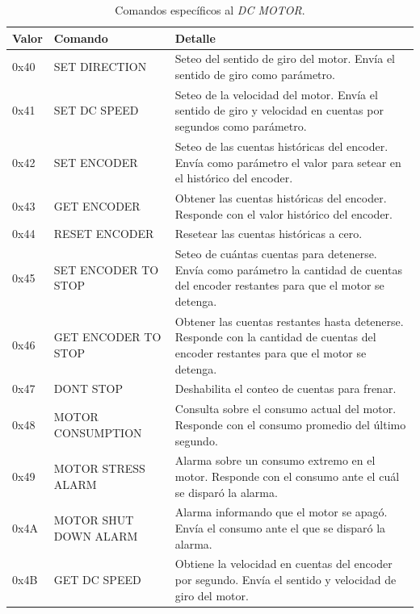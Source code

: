 \begin{table}
	\begin{center}
		\begin{tabular}{|l|p{2.5cm}|p{7.5cm}|}
		\hline
		Valor & Comando & Detalle \\
		\hline
		0x40 & SET DIRECTION & Seteo del sentido de giro del motor.
		Env\'ia el sentido de giro como par\'ametro. \\
		\hline
		0x41 & SET DC SPEED & Seteo de la velocidad del motor.
		Env\'ia el sentido de giro y velocidad en cuentas por segundos como par\'ametro. \\
		\hline
		0x42 & SET ENCODER & Seteo de las cuentas hist\'oricas del encoder.
		Env\'ia como par\'ametro el valor para setear en el hist\'orico del encoder. \\
		\hline
		0x43 & GET ENCODER & Obtener las cuentas hist\'oricas del encoder.
		Responde con el valor hist\'orico del encoder. \\
		\hline
		0x44 & RESET ENCODER & Resetear las cuentas hist\'oricas a cero. \\
		\hline
		0x45 & SET ENCODER TO STOP & Seteo de cu\'antas cuentas para detenerse.
		Env\'ia como par\'ametro la cantidad de cuentas del encoder restantes para
		que el motor se detenga. \\
		\hline
		0x46 & GET ENCODER TO STOP & Obtener las cuentas restantes hasta detenerse.
		Responde con la cantidad de cuentas del encoder restantes para que el motor se detenga. \\
		\hline
		0x47 & DONT STOP & Deshabilita el conteo de cuentas para frenar. \\
		\hline
		0x48 & MOTOR CONSUMPTION & Consulta sobre el consumo actual del motor.
		Responde con el consumo promedio del \'ultimo segundo. \\
		\hline
		0x49 & MOTOR STRESS ALARM & Alarma sobre un consumo extremo en el motor.
		Responde con el consumo ante el cu\'al se dispar\'o la alarma. \\
		\hline
		0x4A & MOTOR SHUT DOWN ALARM & Alarma informando que el motor se apag\'o.
		Env\'ia el consumo ante el que se dispar\'o la alarma. \\
		\hline
		0x4B & GET DC SPEED & Obtiene la velocidad en cuentas del encoder por segundo.
		Env\'ia el sentido y velocidad de giro del motor. \\
		\hline
		\end{tabular}
		\caption{Comandos espec\'ificos al \emph{DC MOTOR}.}
		\label{hT_comm_comandos_motordc}
	\end{center}
\end{table}

